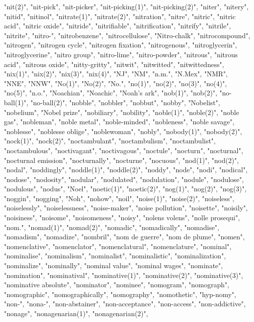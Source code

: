 "nit(2)",
"nit-pick",
"nit-picker",
"nit-picking(1)",
"nit-picking(2)",
"niter",
"nitery",
"nitid",
"nitinol",
"nitrate(1)",
"nitrate(2)",
"nitration",
"nitre",
"nitric",
"nitric acid",
"nitric oxide",
"nitride",
"nitrifiable",
"nitrification",
"nitrify",
"nitrile",
"nitrite",
"nitro-",
"nitrobenzene",
"nitrocellulose",
"Nitro-chalk",
"nitrocompound",
"nitrogen",
"nitrogen cycle",
"nitrogen fixation",
"nitrogenous",
"nitroglycerin",
"nitroglycerine",
"nitro group",
"nitro-lime",
"nitro-powder",
"nitrous",
"nitrous acid",
"nitrous oxide",
"nitty-gritty",
"nitwit",
"nitwitted",
"nitwittedness",
"nix(1)",
"nix(2)",
"nix(3)",
"nix(4)",
"NJ",
"NM",
"n.m.",
"N.Mex",
"NMR",
"NNE",
"NNW",
"No(1)",
"No(2)",
"No.",
"no(1)",
"no(2)",
"no(3)",
"no(4)",
"no(5)",
"n.o.",
"Noachian",
"Noachic",
"Noah's ark",
"nob(1)",
"nob(2)",
"no-ball(1)",
"no-ball(2)",
"nobble",
"nobbler",
"nobbut",
"nobby",
"Nobelist",
"nobelium",
"Nobel prize",
"nobiliary",
"nobility",
"noble(1)",
"noble(2)",
"noble gas",
"nobleman",
"noble metal",
"noble-minded",
"nobleness",
"noble savage",
"noblesse",
"noblesse oblige",
"noblewoman",
"nobly",
"nobody(1)",
"nobody(2)",
"nock(1)",
"nock(2)",
"noctambulant",
"noctambulism",
"noctambulist",
"noctambulous",
"noctivagant",
"noctivagous",
"noctule",
"nocturn",
"nocturnal",
"nocturnal emission",
"nocturnally",
"nocturne",
"nocuous",
"nod(1)",
"nod(2)",
"nodal",
"noddingly",
"noddle(1)",
"noddle(2)",
"noddy",
"node",
"nodi",
"nodical",
"nodose",
"nodosity",
"nodular",
"nodulated",
"nodulation",
"nodule",
"nodulose",
"nodulous",
"nodus",
"Noel",
"noetic(1)",
"noetic(2)",
"nog(1)",
"nog(2)",
"nog(3)",
"noggin",
"nogging",
"Noh",
"nohow",
"noil",
"noise(1)",
"noise(2)",
"noiseless",
"noiselessly",
"noiselessness",
"noise-maker",
"noise pollution",
"noisette",
"noisily",
"noisiness",
"noisome",
"noisomeness",
"noisy",
"nolens volens",
"nolle prosequi",
"nom.",
"nomad(1)",
"nomad(2)",
"nomadic",
"nomadically",
"nomadise",
"nomadism",
"nomadize",
"nombril",
"nom de guerre",
"nom de plume",
"nomen",
"nomenclative",
"nomenclator",
"nomenclatural",
"nomenclature",
"nominal",
"nominalise",
"nominalism",
"nominalist",
"nominalistic",
"nominalization",
"nominalize",
"nominally",
"nominal value",
"nominal wages",
"nominate",
"nomination",
"nominatival",
"nominative(1)",
"nominative(2)",
"nominative(3)",
"nominative absolute",
"nominator",
"nominee",
"nomogram",
"nomograph",
"nomographic",
"nomographically",
"nomography",
"nomothetic",
"hyp-nomy",
"non-",
"nona-",
"non-abstainer",
"non-acceptance",
"non-access",
"non-addictive",
"nonage",
"nonagenarian(1)",
"nonagenarian(2)",
